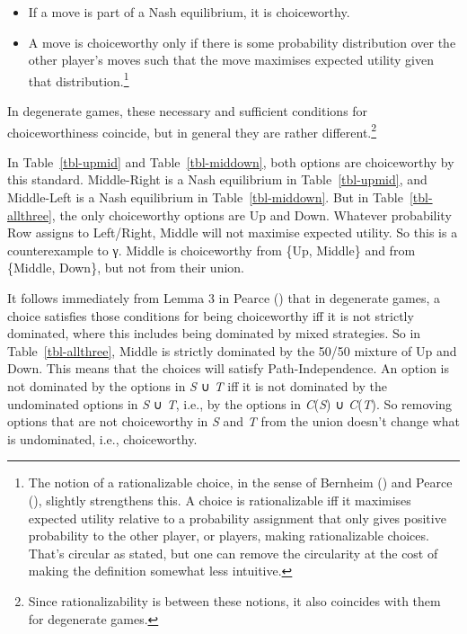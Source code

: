 \documentclass[
  11pt,
  letterpaper,
  DIV=11,
  numbers=noendperiod,
  twoside]{scrartcl}
\providecommand{\tightlist}{%
  \setlength{\itemsep}{0pt}\setlength{\parskip}{0pt}}
\begin{document}
\begin{itemize}
\tightlist
\item
  If a move is part of a Nash equilibrium, it is choiceworthy.
\item
  A move is choiceworthy only if there is some probability distribution
  over the other player's moves such that the move maximises expected
  utility given that distribution.\footnote{The notion of a
    rationalizable choice, in the sense of Bernheim
    () and Pearce
    (), slightly strengthens this. A
    choice is rationalizable iff it maximises expected utility relative
    to a probability assignment that only gives positive probability to
    the other player, or players, making rationalizable choices. That's
    circular as stated, but one can remove the circularity at the cost
    of making the definition somewhat less intuitive.}
\end{itemize}

In degenerate games, these necessary and sufficient conditions for
choiceworthiness coincide, but in general they are rather
different.\footnote{Since rationalizability is between these notions, it
  also coincides with them for degenerate games.}

In Table~\ref{tbl-upmid} and Table~\ref{tbl-middown}, both options are
choiceworthy by this standard. Middle-Right is a Nash equilibrium in
Table~\ref{tbl-upmid}, and Middle-Left is a Nash equilibrium in
Table~\ref{tbl-middown}. But in Table~\ref{tbl-allthree}, the only
choiceworthy options are Up and Down. Whatever probability Row assigns
to Left/Right, Middle will not maximise expected utility. So this is a
counterexample to γ. Middle is choiceworthy from \{Up, Middle\} and from
\{Middle, Down\}, but not from their union.

It follows immediately from Lemma 3 in Pearce
() that in degenerate games, a choice
satisfies those conditions for being choiceworthy iff it is not strictly
dominated, where this includes being dominated by mixed strategies. So
in Table~\ref{tbl-allthree}, Middle is strictly dominated by the 50/50
mixture of Up and Down. This means that the choices will satisfy
Path-Independence. An option is not dominated by the options in \emph{S}
∪ \emph{T} iff it is not dominated by the undominated options in
\emph{S} ∪ \emph{T}, i.e., by the options in \emph{C}(\emph{S}) ∪
\emph{C}(\emph{T}). So removing options that are not choiceworthy in
\emph{S} and \emph{T} from the union doesn't change what is undominated,
i.e., choiceworthy.
\end{document}
